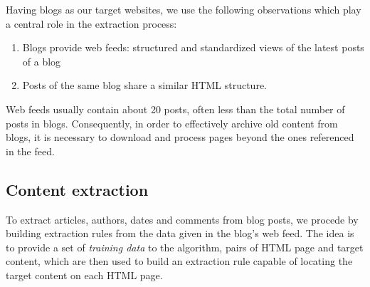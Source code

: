 




Having blogs as our target websites, we use the following observations  which play a central role in the extraction process:
\begin{enumerate}[label={(\arabic*)}]
  \item\label{havefeedAssum} Blogs provide web feeds: structured and standardized views of the latest posts of a blog
  \item\label{similarhtmlAssum} Posts of the same blog share a similar HTML structure.
\end{enumerate}
Web feeds usually contain about 20 posts\cite{oita2010}, often less than the total number of posts in blogs.  Consequently, in order to effectively archive old content from blogs, it is necessary to download and process pages beyond the ones referenced in the feed.


\subsection{Content extraction}
\label{contentextraction}

To extract articles, authors, dates and comments from blog posts, we procede by building extraction rules from the data given in the blog's web feed. The idea is to provide a set of \emph{training data} to the algorithm, pairs of HTML page and target content, which are then used to build an extraction rule capable of locating the target content on each HTML page.

